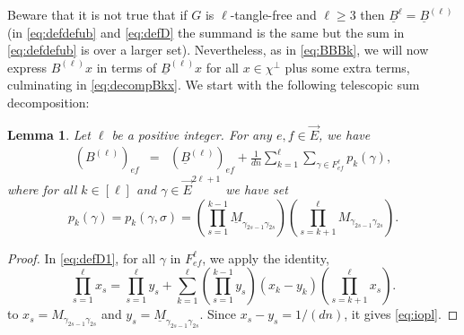 \documentclass[11pt]{article}
\newtheorem{lemma}{Lemma}
\newcommand{\PAR}[1]{{{\left(#1\right)}}} %
\newcommand{\uB}{{\underline B}}
\newcommand{\1}{1\!\!{\sf I}}\newcommand{\IND}{\1}
\begin{document}
Beware that it is not true that if $G$ is $\ell$-tangle-free  and $ \ell \geq 3$ then $\underline B^\ell = \underline B^{(\ell)}$ (in \eqref{eq:defdefub} and \eqref{eq:defD} the summand is the same but the sum in \eqref{eq:defdefub} is over a larger set). Nevertheless, as in \eqref{eq:BBBk}, we will now express $B^{(\ell)}x$ in terms of $\underline B^{(\ell)}x$ for all $x \in \chi^\perp$ plus some extra terms, culminating in \eqref{eq:decompBkx}. We start with the following telescopic sum decomposition:
\begin{lemma}Let $\ell$ be a positive integer. For any $e,f \in \vec E$, we have \begin{eqnarray}\label{eq:iopl}
(B^{(\ell)}) _{e f} &  =  & (\uB^{(\ell)} )_{ef}  + \frac{1}{dn} \sum_{k = 1}^\ell \sum_{\gamma \in F^{\ell} _{e f}}    p_k (\gamma),
\end{eqnarray}
where for all   $k \in[ \ell]$ and $\gamma \in \vec E^{ 2\ell+1}$ we have set
$$
p_k (\gamma) = p_k (\gamma ,\sigma) = \PAR{ \prod_{s=1}^{k-1} \underline M_{\gamma_{2s-1} \gamma_{2s}}} \PAR{\prod_{s = k+1}^\ell M_{\gamma_{2s-1} \gamma_{2s}}}.
$$
\end{lemma}
\begin{proof}
In \eqref{eq:defD1}, for all $\gamma$ in $F^{\ell} _{e f}$, we apply the identity, 
$$
\prod_{s=1}^\ell x_s = \prod_{s=1}^\ell y_s  + \sum_{k=1}^{\ell}\PAR{ \prod_{s=1}^{k-1} y_s } ( x_k - y_k) \PAR{\prod_{s = k+1}^{\ell} x_s}.
$$
to $x_s  = M_{\gamma_{2s-1} \gamma_{2s}}$ and $y_s =  \underline M_{\gamma_{2s-1} \gamma_{2s}}$. Since $x_s - y_s = 1/ (dn)$, it gives \eqref{eq:iopl}.
\end{proof}
\end{document}
